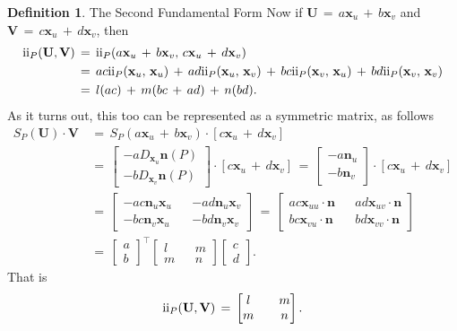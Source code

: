 \documentclass{UKZNcomp}
\newcommand{\vect}[1]{\mathbf{#1}} %
\newcommand{\RN}[1]{%
  \textup{\uppercase\expandafter{\romannumeral#1}}%
}
\theoremstyle{definition}
\newtheorem{definition}{Definition}[section]
\theoremstyle{remark}
\begin{document}
\begin{definition}{The Second Fundamental Form}
Now if $\vect{U}\,=\,a\vect x_u\,+\,b\vect x_v$ and $\vect{V}\,=\,c\vect x_u\,+\,d\vect x_v$, then
\begin{align*}
\RN{2}_P(\vect U, \vect V)\,&=\,\RN{2}_P(a\vect x_u\,+\,b\vect x_v,\,c\vect x_u\,+\,d\vect x_v)\\
&=\,ac\RN{2}_P(\vect x_u,\,\vect x_u)\,+\,ad\RN{2}_P(\vect x_u,\,\vect x_v)\,+\,bc\RN{2}_P(\vect x_v,\,\vect x_u)\,+\,bd\RN{2}_P(\vect x_v,\,\vect x_v)\\
&=\,l(ac)\,+\,m(bc\,+\,ad)\,+\,n(bd).
\end{align*}
As it turns out, this too can be represented as a symmetric matrix, as follows
\begin{align*}
S_P(\vect U)\cdot\vect V\,&=\,S_P(a\vect x_u\,+\,b\vect x_v)\cdot[c\vect x_u\,+\,d\vect x_v]\\
&=\,
\begin{bmatrix}
    -aD_{\vect x_u}\vect n(P) \\
    -bD_{\vect x_v}\vect n(P)
\end{bmatrix}
\cdot [c\vect x_u\,+\,d\vect x_v]
\,=\,
\begin{bmatrix}
    -a\vect n_u\\
    -b\vect n_v
\end{bmatrix}
\cdot [c\vect x_u\,+\,d\vect x_v]\\
&=\,
\begin{bmatrix}
    -ac\vect n_u\vect x_u && -ad\vect n_u\vect x_v\\
    -bc\vect n_v\vect x_u && -bd\vect n_v\vect x_v
\end{bmatrix}
\,=\,
\begin{bmatrix}
    ac\vect x_{uu}\cdot\vect{n} && ad\vect{x}_{uv}\cdot\vect{n}\\
    bc\vect x_{vu}\cdot\vect{n} && bd\vect x_{vv}\cdot\vect{n}
\end{bmatrix}\\
&=\,
\begin{bmatrix}
a\\
b
\end{bmatrix}^\intercal
\begin{bmatrix}
l && m\\
m && n
\end{bmatrix}
\begin{bmatrix}
c\\
d
\end{bmatrix}.
\end{align*}
That is
\begin{align*}
\RN{2}_P(\vect U, \vect V)\,=\,
\begin{bmatrix}
l && m\\
m && n
\end{bmatrix}.
\end{align*}


\end{definition}
\end{document}
